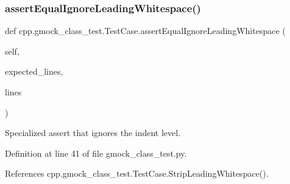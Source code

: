 \subsubsection{\texorpdfstring{assert\+Equal\+Ignore\+Leading\+Whitespace()}{assertEqualIgnoreLeadingWhitespace()}}
{\footnotesize\ttfamily def cpp.\+gmock\+\_\+class\+\_\+test.\+Test\+Case.\+assert\+Equal\+Ignore\+Leading\+Whitespace (\begin{DoxyParamCaption}\item[{}]{self,  }\item[{}]{expected\+\_\+lines,  }\item[{}]{lines }\end{DoxyParamCaption})}

\begin{DoxyVerb}Specialized assert that ignores the indent level.\end{DoxyVerb}
 

Definition at line 41 of file gmock\+\_\+class\+\_\+test.\+py.



References cpp.\+gmock\+\_\+class\+\_\+test.\+Test\+Case.\+Strip\+Leading\+Whitespace().



